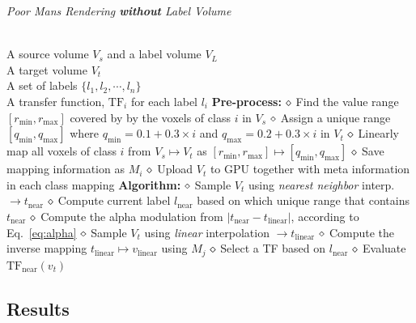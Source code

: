 \documentclass{egpubl}
\begin{document}
\begin{algorithm}[t]
\caption{\label{code:recon} \emph{Poor Mans Rendering \textbf{without} Label Volume}}
\begin{algorithmic}
\REQUIRE \quad\\
A source volume $V_s$ and a label volume $V_L$\\
A target volume  $V_t$\\
A set of labels $\{ l_1, l_2, \cdots, l_n \}$ \\
A transfer function, $\mathrm{TF}_i$ for each label $l_i$ 
\STATE \hspace{-3mm}\textbf{Pre-process:}
 \nonumber
\STATE $\diamond$ Find the value range $[r_\mathrm{min}, r_\mathrm{max}]$ covered by by the voxels of class $i$ in $V_s$
\STATE $\diamond$ Assign a unique range $[q_\mathrm{min},q_\mathrm{max}]$ where $q_\mathrm{min} = 0.1+0.3\times i$ and $q_\mathrm{max} = 0.2+0.3\times i$ in $V_t$
\STATE $\diamond$ Linearly map all voxels of class $i$ from $V_s \mapsto V_t$ as $[r_\mathrm{min}, r_\mathrm{max}] \mapsto [q_\mathrm{min},q_\mathrm{max}]$
\STATE $\diamond$ Save mapping information as $M_i$
\ENDFOR
\STATE $\diamond$ Upload $V_t$ to GPU together with meta information in each class mapping
\STATE \hspace{-3mm}\textbf{Algorithm:}
 \nonumber
\STATE $\diamond$ Sample $V_t$ using \emph{nearest neighbor} interp. $\rightarrow t_\mathrm{near}$
\STATE $\diamond$ Compute current label $l_\mathrm{near}$ based on which unique range that contains $t_\mathrm{near}$ 
\STATE $\diamond$ Compute the alpha modulation from $|t_\mathrm{near}-t_\mathrm{linear}|$, according to Eq.~\ref{eq:alpha}
\STATE $\diamond$ Sample $V_t$ using \emph{linear} interpolation $\rightarrow t_\mathrm{linear}$
\STATE $\diamond$ Compute the inverse mapping $t_\mathrm{linear} \mapsto v_\mathrm{linear}$ using $M_j$
\STATE $\diamond$ Select a TF based on $l_\mathrm{near}$ 
\STATE $\diamond$ Evaluate $\mathrm{TF}_\mathrm{near}(v_t)$ 
\ENDFOR
\end{algorithmic}
\end{algorithm}


\subsection{Results}



\end{document}
